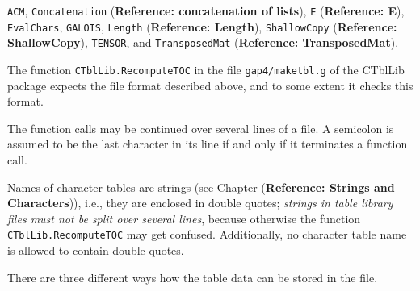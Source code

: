 \documentclass[a4paper,11pt]{report}
\begin{document}
{{{ \texttt{ACM}, \texttt{Concatenation} (\textbf{Reference: concatenation of lists}), \texttt{E} (\textbf{Reference: E}), \texttt{EvalChars}, \texttt{GALOIS}, \texttt{Length} (\textbf{Reference: Length}), \texttt{ShallowCopy} (\textbf{Reference: ShallowCopy}), \texttt{TENSOR}, and \texttt{TransposedMat} (\textbf{Reference: TransposedMat}). 

 The function \texttt{CTblLib.RecomputeTOC} in the file \texttt{gap4/maketbl.g} of the \textsf{CTblLib} package expects the file format described above, and to some extent it checks
this format. 

 The function calls may be continued over several lines of a file. A semicolon
is assumed to be the last character in its line if and only if it terminates a
function call. 

 Names of character tables are strings (see Chapter{\nobreakspace} (\textbf{Reference: Strings and Characters})), i.{\nobreakspace}e., they are enclosed in double quotes; \emph{strings in table library files must not be split over several lines}, because otherwise the function \texttt{CTblLib.RecomputeTOC} may get confused. Additionally, no character table name is allowed to contain
double quotes. 

 There are three different ways how the table data can be stored in the file. 

}}}
\end{document}
